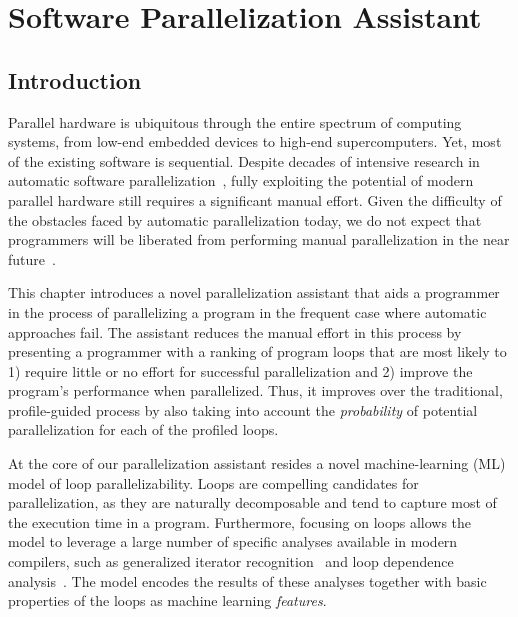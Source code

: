 \chapter{Software Parallelization Assistant}
\label{assistant}
\section{Introduction}


\quad Parallel hardware is ubiquitous through the entire spectrum of computing systems, from low-end embedded devices to high-end supercomputers.
%
Yet, most of the existing software is sequential.
%
Despite decades of intensive research in automatic software
parallelization~\cite{6813266}, fully exploiting the potential of modern parallel hardware still requires a significant manual effort.
%
Given the difficulty of the obstacles faced by automatic parallelization today, we do not expect that programmers will be liberated from performing manual parallelization in the near future~\cite{Larsen:2012:PML:2410141.2410600}.


This chapter introduces a novel parallelization assistant that aids a programmer in the process of parallelizing a program in the frequent case where automatic approaches fail.
%
The assistant reduces the manual effort in this process by presenting a programmer with a ranking of program loops that are most likely to 1) require little or no effort for successful parallelization and 2) improve the program's performance when parallelized.
%
Thus, it improves over the traditional, profile-guided process by also taking into account the \emph{probability} of potential parallelization for each of the profiled loops.


At the core of our parallelization assistant resides a novel machine-learning (ML) model of loop parallelizability.
%
Loops are compelling candidates for parallelization, as they are naturally decomposable and tend to capture most of the execution time in a program.
%
Furthermore, focusing on loops allows the model to leverage a large number of specific analyses available in modern compilers, such as generalized iterator recognition~\cite{Manilov:2018:GPI:3178372.3179511} and loop dependence analysis~\cite{Jensen:2017:ILD:3132652.3095754}.
%
The model encodes the results of these analyses together with basic properties of the loops as machine learning \textit{features}.

